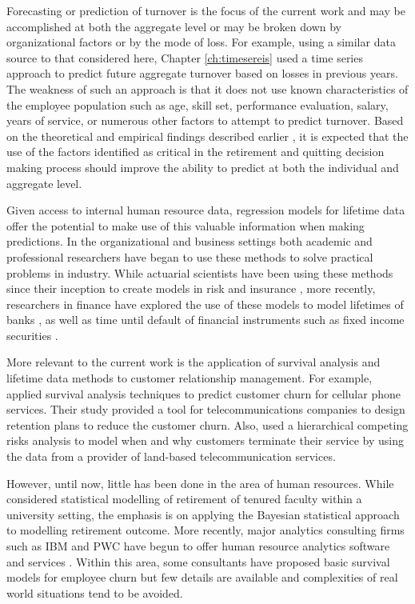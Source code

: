 Forecasting or prediction of turnover is the focus of the current work and may be accomplished at both the aggregate level or may be broken down by organizational factors or by the mode of loss.  For example, using a similar data source to that considered here,  Chapter \ref{ch:timesereis} used a time series approach to predict future aggregate turnover based on losses in previous years.  The weakness of such an approach is that it does not use known characteristics of the employee population such as age, skill set, performance evaluation, salary, years of service, or numerous other factors to attempt to predict turnover.  Based on the theoretical and empirical findings described earlier \citep{rainlall2004,Wang2010}, it is expected that the use of the factors identified as critical in the retirement and quitting decision making process should improve the ability to predict at both the individual and aggregate level.

Given access to internal human resource data, regression models for lifetime data offer the potential to make use of this valuable information when making predictions. In the organizational and business settings both academic and professional researchers have began to use these methods to solve practical problems in industry. While actuarial scientists have been using these methods since their inception to create models in risk and insurance \citep{brockett2008}, more recently, researchers in finance have explored the use of these models to model lifetimes of banks \citep{Lane1986}, as well as time until default of financial instruments such as fixed income securities \citep{leclere2005}.

More relevant to the current work is the application of survival analysis and lifetime data methods to customer relationship management.  For example, \citet{lu2002} applied survival analysis techniques to predict customer churn for cellular phone services. Their study provided a tool for telecommunications companies to design retention plans to reduce the customer churn.  Also, \citet{braun2011} used a hierarchical competing risks analysis to model when and why customers terminate their service by using the data from a provider of land-based telecommunication services.

However, until now, little has been done in the area of human resources.  While \citet{berger1993} considered statistical modelling of retirement of tenured faculty within a university setting, the emphasis is on applying the Bayesian statistical approach to modelling retirement outcome.  More recently, major analytics consulting firms such as IBM and PWC have begun to offer human resource analytics software and services \citep{IBM,PWC}.  Within this area, some consultants have proposed basic survival models for employee churn \citep{briggs2015} but few details are available and complexities of real world situations tend to be avoided.

